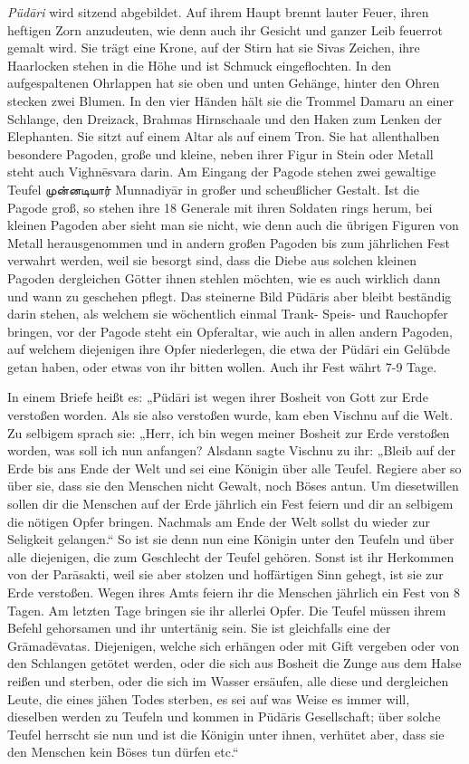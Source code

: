 \documentclass{article}
\newcommand{\TamilText}[1]{\texttamil{#1}}
\newcommand{\tam}[1]{\TamilText{#1}}
\begin{document}
\emph{Püd\={a}ri} wird sitzend abgebildet. Auf ihrem Haupt brennt lauter Feuer, ihren heftigen Zorn anzudeuten, wie denn auch ihr Gesicht und ganzer Leib feuerrot gemalt wird. Sie trägt eine Krone, auf der Stirn hat sie Sivas Zeichen, ihre Haarlocken stehen in die Höhe und ist Schmuck eingeflochten. In den aufgespaltenen Ohrlappen hat sie oben und unten Gehänge, hinter den Ohren stecken zwei Blumen. In den vier Händen hält sie die Trommel Damaru an einer Schlange, den Dreizack, Brahmas Hirnschaale und den Haken zum Lenken der Elephanten. Sie sitzt auf einem Altar als auf einem Tron. Sie hat allenthalben besondere Pagoden, große und kleine, neben ihrer Figur in Stein oder Metall steht auch Vighn\={e}svara darin. Am Eingang der Pagode stehen zwei gewaltige Teufel \tam{முன்னடியார்} Munnadiy\={a}r in großer und scheußlicher Gestalt. Ist die Pagode groß, so stehen ihre 18 Generale mit ihren Soldaten rings herum, bei kleinen Pagoden aber sieht man sie nicht, wie denn auch die übrigen Figuren von Metall herausgenommen und in andern großen Pagoden bis zum jährlichen Fest verwahrt werden, weil sie besorgt sind, dass die Diebe aus solchen kleinen Pagoden dergleichen Götter ihnen stehlen möchten, wie es auch wirklich dann und wann zu geschehen pflegt. Das steinerne Bild Püd\={a}ris aber bleibt beständig darin stehen, als welchem sie wöchentlich einmal Trank- Speis- und Rauchopfer bringen, vor der Pagode steht ein Opferaltar, wie auch in allen andern Pagoden, auf welchem diejenigen ihre Opfer niederlegen, die etwa der Püd\={a}ri ein Gelübde getan haben, oder etwas von ihr bitten wollen. Auch ihr Fest währt 7-9 Tage.

In einem Briefe heißt es: „Püd\={a}ri ist wegen ihrer Bosheit von Gott zur Erde verstoßen worden. Als sie also verstoßen wurde, kam eben Vischnu auf die Welt. Zu selbigem sprach sie: „Herr, ich bin wegen meiner Bosheit zur Erde verstoßen worden, was soll ich nun anfangen? Alsdann sagte Vischnu zu ihr: „Bleib auf der Erde bis ans Ende der Welt und sei eine Königin über alle Teufel. Regiere aber so über sie, dass sie den Menschen nicht Gewalt, noch Böses antun. Um diesetwillen sollen dir die Menschen auf der Erde jährlich ein Fest feiern und dir an selbigem die nötigen Opfer bringen. Nachmals am Ende der Welt sollst du wieder zur Seligkeit gelangen.“ So ist sie denn nun eine Königin unter den Teufeln und über alle diejenigen, die zum Geschlecht der Teufel gehören. Sonst ist ihr Herkommen von der Par\={a}sakti, weil sie aber stolzen und hoffärtigen Sinn gehegt, ist sie zur Erde verstoßen. Wegen ihres Amts feiern ihr die Menschen jährlich ein Fest von 8 Tagen. Am letzten Tage bringen sie ihr allerlei Opfer. Die Teufel müssen ihrem Befehl gehorsamen und ihr untertänig sein. Sie ist gleichfalls eine der Gr\={a}mad\={e}vatas. Diejenigen, welche sich erhängen oder mit Gift vergeben oder von den Schlangen getötet werden, oder die sich aus Bosheit die Zunge aus dem Halse reißen und sterben, oder die sich im Wasser ersäufen, alle diese und dergleichen Leute, die eines jähen Todes sterben, es sei auf was Weise es immer will, dieselben werden zu Teufeln und kommen in Püd\={a}ris Gesellschaft; über solche Teufel herrscht sie nun und ist die Königin unter ihnen, verhütet aber, dass sie den Menschen kein Böses tun dürfen etc.“
\end{document}
